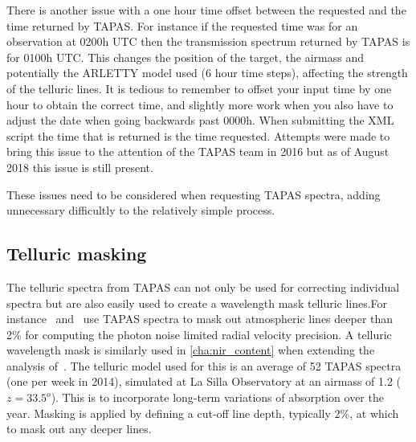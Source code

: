 There is another issue with a one hour time offset between the requested and the time returned by {TAPAS}.
For instance if the requested time was for an observation at 0200h {UTC} then the transmission spectrum returned by {TAPAS} is for 0100h {UTC}.
This changes the position of the target, the airmass and potentially the {ARLETTY} model used (6 hour time steps), affecting the strength of the telluric lines.
It is tedious to remember to offset your input time by one hour to obtain the correct time, and slightly more work when you also have to adjust the date when going backwards past 0000h.
When submitting the {XML} script the time that is returned is the time requested.
Attempts were made to bring this issue to the attention of the {TAPAS} team in 2016 but as of August 2018 this issue is still present.

These issues need to be considered when requesting {TAPAS} spectra, adding unnecessary difficultly to the relatively simple process.


\subsection{Telluric masking}
The telluric spectra from {TAPAS} can not only be used for correcting individual spectra but are also easily used to create a wavelength mask telluric lines.For instance~\citet{figueira_radial_2016} and~\citet{artigau_optical_2018} use {TAPAS} spectra to mask out atmospheric lines deeper than 2\% for computing the photon noise limited radial velocity precision.
A telluric wavelength mask is similarly used in \cref{cha:nir_content} when extending the analysis of~\citet{figueira_radial_2016}.
The telluric model used for this is an average of 52 {TAPAS} spectra (one per week in 2014), simulated at La Silla Observatory at an airmass of 1.2 (\(z = 33.5^{o}\)).
This is to incorporate long-term variations of absorption over the year.
Masking is applied by defining a cut-off line depth, typically 2\%, at which to mask out any deeper lines.
